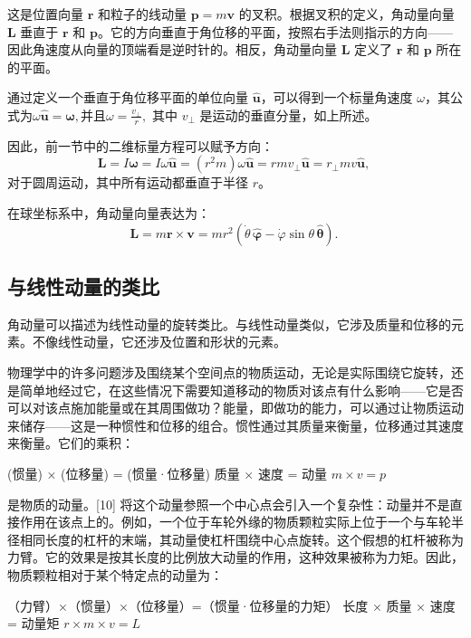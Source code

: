 这是位置向量 \( \mathbf{r} \) 和粒子的线动量 \( \mathbf{p} = m\mathbf{v} \) 的叉积。根据叉积的定义，角动量向量 \( \mathbf{L} \) 垂直于 \( \mathbf{r} \) 和 \( \mathbf{p} \)。它的方向垂直于角位移的平面，按照右手法则指示的方向——因此角速度从向量的顶端看是逆时针的。相反，角动量向量 \( \mathbf{L} \) 定义了 \( \mathbf{r} \) 和 \( \mathbf{p} \) 所在的平面。

通过定义一个垂直于角位移平面的单位向量 \( \mathbf{\hat{u}} \)，可以得到一个标量角速度 \( \omega \)，其公式为\(\omega \mathbf{\hat{u}} = {\boldsymbol{\omega}},\)并且\(\omega = \frac{v_{\perp}}{r}, \)
其中 \( v_{\perp} \) 是运动的垂直分量，如上所述。

因此，前一节中的二维标量方程可以赋予方向：
\[
\mathbf{L} = I{\boldsymbol{\omega}} = I\omega \mathbf{\hat{u}} = \left(r^{2}m\right)\omega \mathbf{\hat{u}} = rmv_{\perp} \mathbf{\hat{u}} = r_{\perp}mv \mathbf{\hat{u}},~
\]
对于圆周运动，其中所有运动都垂直于半径 \( r \)。

在球坐标系中，角动量向量表达为：
\[
\mathbf{L} = m\mathbf{r} \times \mathbf{v} = mr^{2} \left( \dot{\theta} \, {\hat{\boldsymbol{\varphi}}} - \dot{\varphi} \sin \theta \, \mathbf{\hat{\boldsymbol{\theta}}} \right).~
\]
\subsection{与线性动量的类比 } 
角动量可以描述为线性动量的旋转类比。与线性动量类似，它涉及质量和位移的元素。不像线性动量，它还涉及位置和形状的元素。  

物理学中的许多问题涉及围绕某个空间点的物质运动，无论是实际围绕它旋转，还是简单地经过它，在这些情况下需要知道移动的物质对该点有什么影响——它是否可以对该点施加能量或在其周围做功？能量，即做功的能力，可以通过让物质运动来储存——这是一种惯性和位移的组合。惯性通过其质量来衡量，位移通过其速度来衡量。它们的乘积：

(惯量) × (位移量) = (惯量·位移量)  
质量 × 速度 = 动量  
\( m \times v = p \)

是物质的动量。[10] 将这个动量参照一个中心点会引入一个复杂性：动量并不是直接作用在该点上的。例如，一个位于车轮外缘的物质颗粒实际上位于一个与车轮半径相同长度的杠杆的末端，其动量使杠杆围绕中心点旋转。这个假想的杠杆被称为力臂。它的效果是按其长度的比例放大动量的作用，这种效果被称为力矩。因此，物质颗粒相对于某个特定点的动量为：

（力臂）×（惯量）×（位移量）=（惯量·位移量的力矩）  
长度 × 质量 × 速度 = 动量矩  
\( r \times m \times v = L \)

